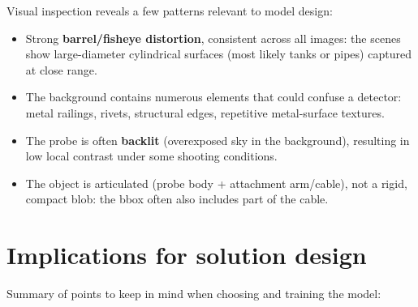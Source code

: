 \documentclass[11pt,a4paper]{article}
\begin{document}
Visual inspection reveals a few patterns relevant to model design:

\begin{itemize}[nosep]
    \item Strong \textbf{barrel/fisheye distortion}, consistent across all images: the scenes
          show large-diameter cylindrical surfaces (most likely tanks or pipes) captured at close
          range.
    \item The background contains numerous elements that could confuse a detector: metal
          railings, rivets, structural edges, repetitive metal-surface textures.
    \item The probe is often \textbf{backlit} (overexposed sky in the background), resulting in
          low local contrast under some shooting conditions.
    \item The object is articulated (probe body + attachment arm/cable), not a rigid, compact
          blob: the bbox often also includes part of the cable.
\end{itemize}

\section{Implications for solution design}

Summary of points to keep in mind when choosing and training the model:
\end{document}
